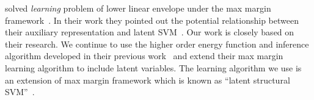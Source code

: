 \documentclass[twoside,doublespace,onecolumn,11pt,a4paper]{book}
\renewcommand{\citename}{\citet}
\renewcommand{\cite}{\citep}
\begin{document}
\citename{gouldlearning} solved \emph{learning} problem of lower
linear envelope under the max margin
framework~\cite{tsochantaridis2005large}. In their work they
pointed out the potential relationship between their auxiliary
representation and latent SVM~\cite{yu2009learning}. Our work is
closely based on their research. We continue to use the higher
order energy function and inference algorithm developed in their
previous work~\cite{Gould:ICML2011} and extend their max margin
learning algorithm to include latent variables. The learning
algorithm we use is an extension of max margin framework which is
known as ``latent structural SVM''~\cite{yu2009learning}.




\end{document}

